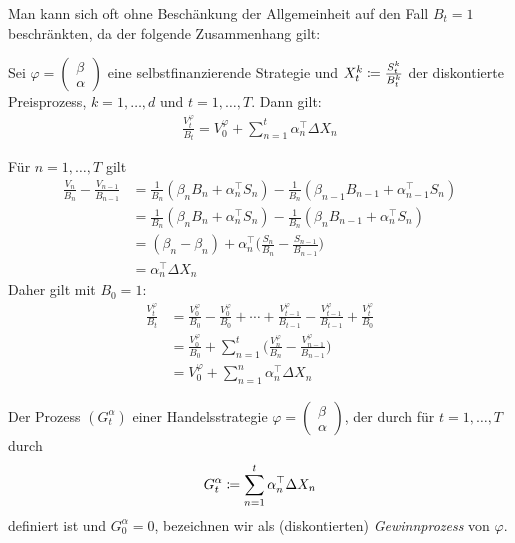 \documentclass[a4paper,twoside,DIV15,BCOR12mm]{scrbook}
\begin{document}
Man kann sich oft ohne Beschänkung der Allgemeinheit auf den Fall $B_t=1$ beschränkten, da der folgende Zusammenhang gilt:
\begin{lemma}
\label{lem:2.3.6}Sei $\varphi
=\left(\begin{smallmatrix}
\beta \\ \alpha
\end{smallmatrix}\right)$ eine selbstfinanzierende Strategie und $X_t^k \da \frac{S_t^k}{B_t^k}$ der diskontierte Preisprozess, $k=1,\ldots,d$ und $t=1,\ldots,T$. Dann gilt:
\begin{align*}
\frac{V_t^\varphi}{B_t} = V_0^\varphi + \sum_{n=1}^t \alpha_n^\top \Delta X_n
\end{align*}
\end{lemma}

\begin{beweis}
Für $n=1,\ldots,T$ gilt
\begin{align*}
\frac{V_n}{B_n} - \frac{V_{n-1}}{B_{n-1}} 
&= \frac 1 {B_n} (\beta_n B_n + \alpha_n^\top S_n) - \frac1{B_n}(\beta_{n-1}B_{n-1} + \alpha_{n-1}^\top S_n) \\
&= \frac 1 {B_n} (\beta_n B_n + \alpha_n^\top S_n) - \frac1{B_n}(\beta_{n}B_{n-1} + \alpha_{n}^\top S_n) \\
&= (\beta_n - \beta_n) + \alpha_n^\top \bigg(\frac{S_n}{B_n} - \frac{S_{n-1}}{B_{n-1}}\bigg) \\
&= \alpha_n^\top \Delta X_n
\end{align*}
Daher gilt mit $B_0=1$:
\begin{align*}
\frac{V_t^\varphi}{B_t} 
&= \frac{V_0^\varphi}{B_0} - \frac{V_0^\varphi}{B_0} + \cdots + \frac{V_{t-1}^\varphi}{B_{t-1}} - \frac{V_{t-1}^\varphi}{B_{t-1}} + \frac{V_t^\varphi}{B_0} \\
&= \frac{V_0^\varphi}{B_0} + \sum_{n=1}^t \bigg(\frac{V_n^\varphi}{B_n} -  \frac{V_{n-1}^\varphi}{B_{n-1}}\bigg) \\
&= V_0^\varphi + \sum_{n=1}^n \alpha_n^\top \Delta X_n
\end{align*}
\end{beweis}

\begin{definition}
Der Prozess $(G_t^\alpha)$ einer Handelsstrategie $\varphi
=\left(\begin{smallmatrix}
\beta \\ \alpha
\end{smallmatrix}\right)$, der durch für $t=1,\ldots,T$ durch
\[
G_t^\alpha  \da \sum_{n=1}^t \alpha_n^\top \Delta X_n
\]
definiert ist und $G_0^\alpha = 0$, bezeichnen wir als (diskontierten) \emph{Gewinnprozess} von $\varphi$.
\end{definition}
\end{document}
